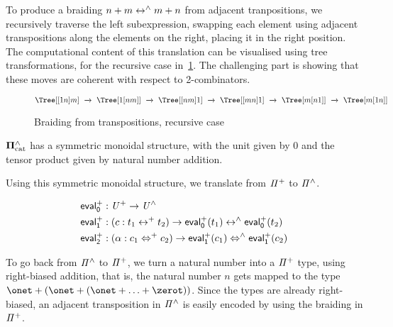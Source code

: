 To produce a braiding $n + m \mathrel{\leftrightarrow^{\wedge}} m + n$ from adjacent tranpositions, we recursively traverse the left subexpression,
swapping each element using adjacent transpositions along the elements on the right, placing it in the right position.
The computational content of this translation can be visualised using tree transformations, for the recursive case
in~\cref{fig:plusplusswap}. The challenging part is showing that these moves are coherent with respect to 2-combinators.

\begin{figure}
   \[
      \Tree [ [ {\tiny 1} {\tiny n} ] {\tiny m} ] ~\xrightarrow{}~
      \Tree [ {\tiny 1} [ {\tiny n} {\tiny m} ] ] ~\xrightarrow{}~
      \Tree [ [ {\tiny n} {\tiny m} ] {\tiny 1} ] ~\xrightarrow{}~
      \Tree [ [ {\tiny m} {\tiny n} ] {\tiny 1} ] ~\xrightarrow{}~
      \Tree [ {\tiny m} [ {\tiny n} {\tiny 1} ] ] ~\xrightarrow{}~
      \Tree [ {\tiny m} [ {\tiny 1} {\tiny n} ] ] ~
    \]
  \label{fig:plusplusswap}
  \caption{Braiding from transpositions, recursive case}
\end{figure}

\begin{lemma}
  $\mathbf{\Pi}^{\wedge}_{\mathrm{cat}}$ has a symmetric monoidal structure, with the unit given by 0 and the tensor product given by natural
  number addition.
\end{lemma}

\noindent Using this symmetric monoidal structure, we translate from $\mathit{{\Pi}^{+}}$ to $\mathit{{\Pi}^{\wedge}}$.

\begin{definition}[$\evalp$]
  \begin{align*}
    \evalp_{0} & : \UPlus \to \UHat                                                           \\
    \evalp_{1} & : (c : t_{1} \isop t_{2}) \to \evalp_{0}(t_{1}) \isoh \evalp_{0}(t_{2})      \\
    \evalp_{2} & : (\alpha : c_{1} \Isop c_{2}) \to \evalp_{1}(c_{1}) \Isoh \evalp_{1}(c_{2})
  \end{align*}
\end{definition}

To go back from $\mathit{{\Pi}^{\wedge}}$ to $\mathit{{\Pi}^{+}}$, we turn a natural number into a $\mathit{{\Pi}^{+}}$ type, using right-biased
addition, that is, the natural number $n$ gets mapped to the type $\onet + (\onet + (\onet + \ldots + \zerot))$. Since
the types are already right-biased, an adjacent transposition in $\mathit{{\Pi}^{\wedge}}$ is easily encoded by using the braiding in
$\mathit{{\Pi}^{+}}$.

